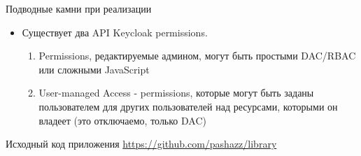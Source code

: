 \documentclass[presentation]{beamer}
\begin{document}
\begin{frame}[label={sec:orga53298f}]{Подводные камни при реализации}
\begin{itemize}
\item Существует два API Keycloak permissions.
\begin{enumerate}
\item Permissions, редактируемые админом, могут быть простыми DAC/RBAC или сложными JavaScript
\item User-managed Access - permissions, которые могут быть заданы пользователем для других пользователей над ресурсами, которыми он владеет (это отключаемо, только DAC)
\end{enumerate}
\end{itemize}
\end{frame}


\begin{frame}[label={sec:org5cdfac3}]{Исходный код приложения}
\url{https://github.com/pashazz/library}
\end{frame}
\end{document}
